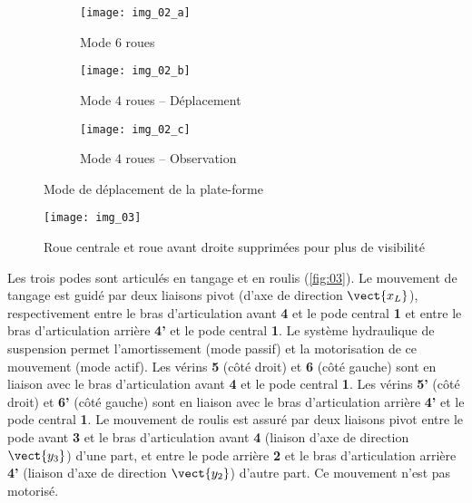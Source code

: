 \begin{figure}
\centering
\begin{subfigure}{0.3\textwidth}
    \texttt{[image: img\_02\_a]}
    \caption{Mode 6 roues}
    \label{fig:02a}
\end{subfigure}
\begin{subfigure}{0.3\textwidth}
    \texttt{[image: img\_02\_b]}
    \caption{Mode 4 roues -- Déplacement}
    \label{fig:02a}
\end{subfigure}
\begin{subfigure}{0.3\textwidth}
    \texttt{[image: img\_02\_c]}
    \caption{Mode 4 roues -- Observation}
    \label{fig:02a}
\end{subfigure}\caption{Mode de déplacement de la plate-forme \label{fig:02}}
\end{figure}


\begin{figure}
\centering
\texttt{[image: img\_03]}
\caption{Roue centrale et roue avant droite supprimées pour plus de visibilité \label{img:03}}
\end{figure}

Les trois podes sont articulés en tangage et en roulis (\autoref{fig:03}). Le mouvement de tangage est guidé par deux liaisons pivot (d’axe de direction  $\vect{x_L}$), respectivement entre le bras d’articulation avant \textbf{4} et le pode central \textbf{1} et entre le bras d’articulation arrière \textbf{4’} et le pode central \textbf{1}. Le système hydraulique de suspension permet l’amortissement (mode passif) et la motorisation de ce mouvement (mode actif). Les vérins \textbf{5} (côté droit) et \textbf{6} (côté gauche) sont en liaison avec le bras d’articulation avant \textbf{4} et le pode central \textbf{1}. Les vérins \textbf{5’} (côté droit) et \textbf{6’} (côté gauche) sont en liaison avec le bras d’articulation arrière \textbf{4’} et le pode central \textbf{1}. Le mouvement de roulis est assuré par deux liaisons pivot entre le pode avant \textbf{3} et le bras d’articulation avant \textbf{4} (liaison d’axe de direction $\vect{y_3}$) d’une part, et entre le pode arrière \textbf{2} et le bras d’articulation arrière \textbf{4’}  (liaison d’axe de direction $\vect{y_2}$) d’autre part. Ce mouvement n’est pas motorisé. 

